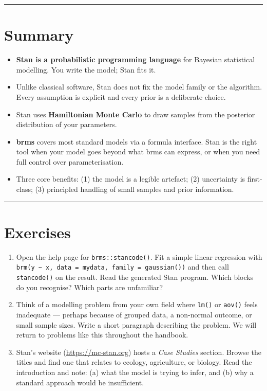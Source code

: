 \documentclass[
  11pt,
  a4paper,
  oneside,
  openany]{scrbook}
\providecommand{\tightlist}{%
  \setlength{\itemsep}{0pt}\setlength{\parskip}{0pt}}\usepackage{longtable,booktabs,array}
\begin{document}
\begin{center}\rule{0.5\linewidth}{0.5pt}\end{center}

\section{Summary}\label{summary}

\begin{itemize}
\tightlist
\item
  \textbf{Stan is a probabilistic programming language} for Bayesian
  statistical modelling. You write the model; Stan fits it.
\item
  Unlike classical software, Stan does not fix the model family or the
  algorithm. Every assumption is explicit and every prior is a
  deliberate choice.
\item
  Stan uses \textbf{Hamiltonian Monte Carlo} to draw samples from the
  posterior distribution of your parameters.
\item
  \textbf{brms} covers most standard models via a formula interface.
  Stan is the right tool when your model goes beyond what brms can
  express, or when you need full control over parameterisation.
\item
  Three core benefits: (1) the model is a legible artefact; (2)
  uncertainty is first-class; (3) principled handling of small samples
  and prior information.
\end{itemize}

\begin{center}\rule{0.5\linewidth}{0.5pt}\end{center}

\section{Exercises}\label{exercises}

\begin{enumerate}
\def\labelenumi{\arabic{enumi}.}
\item
  Open the help page for \texttt{brms::stancode()}. Fit a simple linear
  regression with
  \texttt{brm(y\ \textasciitilde{}\ x,\ data\ =\ mydata,\ family\ =\ gaussian())}
  and then call \texttt{stancode()} on the result. Read the generated
  Stan program. Which blocks do you recognise? Which parts are
  unfamiliar?
\item
  Think of a modelling problem from your own field where \texttt{lm()}
  or \texttt{aov()} feels inadequate --- perhaps because of grouped
  data, a non-normal outcome, or small sample sizes. Write a short
  paragraph describing the problem. We will return to problems like this
  throughout the handbook.
\item
  Stan's website (\url{https://mc-stan.org}) hosts a \emph{Case Studies}
  section. Browse the titles and find one that relates to ecology,
  agriculture, or biology. Read the introduction and note: (a) what the
  model is trying to infer, and (b) why a standard approach would be
  insufficient.
\end{enumerate}
\end{document}
